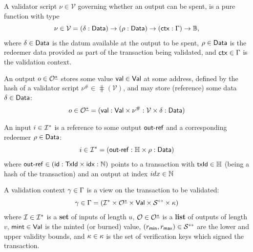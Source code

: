 \begin{definition}
  A validator script $\nu \in \mathcal{V}$ governing whether an output can be
  spent, is a pure function with type
  \[
    \nu \in \mathcal{V} = (\delta : \mathsf{Data}) \to (\rho : \mathsf{Data}) \to (\mathsf{ctx} : \Gamma) \to\mathbb{B},
  \]
  where $\delta \in \mathsf{Data}$ is the datum available at the output to be spent,
  $\rho \in \mathsf{Data}$ is the redeemer data provided as part of the transaction
  being validated, and $\mathsf{ctx} \in \Gamma$ is the validation
  context.
\end{definition}

\begin{definition}[Outputs]
  An output $o \in \mathcal{O}^{\underline{*}}$ stores some value $\mathsf{val} \in \mathsf{Val}$ at some address,
  defined by the hash of a validator script $\nu^{\#} \in \hash(\mathcal{V})$,
  and may store (reference) some data $\delta \in \mathsf{Data}$:
  \[
    o \in \mathcal{O}^{\underline{*}} = (\mathsf{val} : \mathsf{Val} \times \nu^{\#} : \mathcal{V} \times \delta : \mathsf{Data})
  \]
\end{definition}

\begin{definition}[Inputs]
  An input $i \in \mathcal{I}^*$ is a reference to some output $\mathsf{out\textsf{-}{}ref}$ and a
  corresponding redeemer $\rho \in \mathsf{Data}$:
  \[
    i \in \mathcal{I}^* = (\mathsf{out\textsf{-}{}ref} : \mathbb{H} \times \rho : \mathsf{Data})
  \]
  where
  $\mathsf{out\textsf{-}{}ref} \in (\mathsf{id} : \mathsf{TxId} \times \mathsf{idx} : \mathbb{N})$
  points to a transaction with $\mathsf{txId} \in \mathbb{H}$ (being a hash of the
  transaction) and an output at index $idx \in \mathbb{N}$
\end{definition}

\begin{definition}
  A validation context $\gamma \in \Gamma$ is a view on the transaction
  to be validated:
  \[
    \gamma \in \Gamma = (\mathcal{I}^* \times \mathcal{O}^{\underline{*}} \times \mathsf{Val} \times \mathcal{S}^{\leftrightarrow} \times \kappa)
  \]
  where $\mathcal{I} \in \mathcal{I}^*$  is a
  \textbf{set} of inputs of length $u$, $\mathcal{O} \in \mathcal{O}^{\underline{*}}$ is a
  \textbf{list} of outputs of length $v$, $\mathsf{mint} \in \mathsf{Val}$ is the
  minted (or burned) value,
  $(r_{\mathsf{min}}, r_{\mathsf{max}}) \in \mathcal{S}^{\leftrightarrow}$
   are
  the lower and upper validity bounds, and $\kappa \in \kappa$ is the set of
  verification keys which signed the transaction.
\end{definition}


